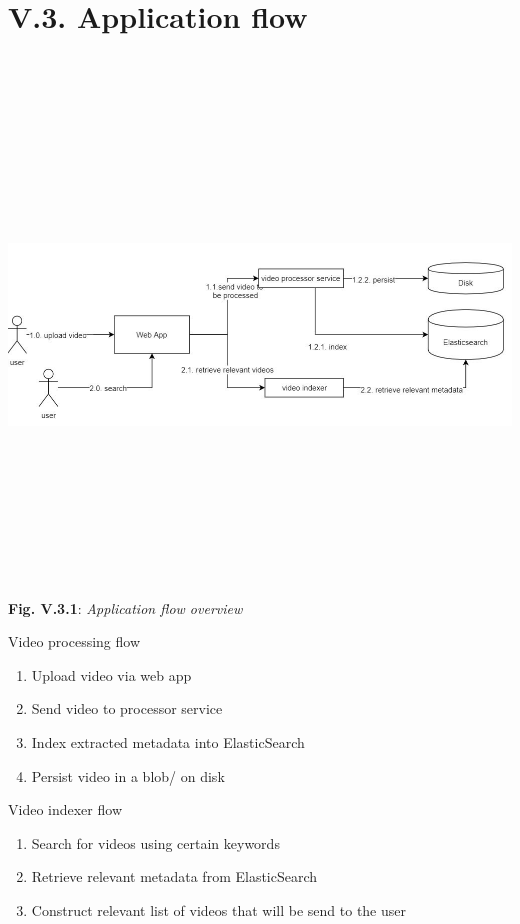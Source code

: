 \documentclass[11pt, a4papper]{report}
\theoremstyle{plain}
\theoremstyle{definition}
\theoremstyle{definition}
\theoremstyle{proposition}
\begin{document}
\section*{V.3. Application flow}
\
\\
\begin{center}
	\includegraphics[width=16cm,height=13cm,keepaspectratio]{application-flow.jpg}
\end{center}
\begin{center}
	\textbf{Fig. V.3.1}: \textit{Application flow overview}
\end{center}

Video processing flow

\begin{enumerate}
	\item Upload video via web app
	\item Send video to processor service
	\item Index extracted metadata into ElasticSearch
	\item Persist video in a blob/ on disk
\end{enumerate}

Video indexer flow

\begin{enumerate}
	\item Search for videos using certain keywords
	\item Retrieve relevant metadata from ElasticSearch
	\item Construct relevant list of videos that will be send to the user
\end{enumerate}
\end{document}
